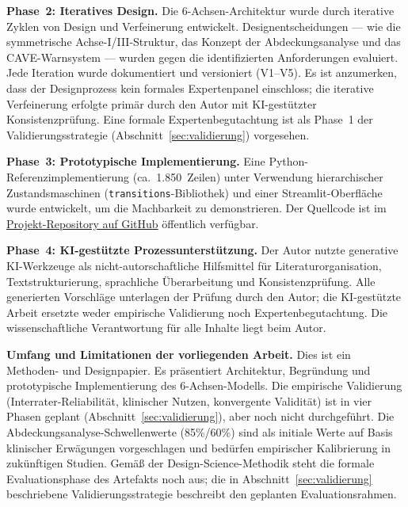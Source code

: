 \documentclass[11pt,a4paper]{article}
\begin{document}
\textbf{Phase~2: Iteratives Design.} Die 6-Achsen-Architektur wurde durch iterative Zyklen von Design und Verfeinerung entwickelt. Designentscheidungen --- wie die symmetrische Achse-I/III-Struktur, das Konzept der Abdeckungsanalyse und das CAVE-Warnsystem --- wurden gegen die identifizierten Anforderungen evaluiert. Jede Iteration wurde dokumentiert und versioniert (V1--V5). Es ist anzumerken, dass der Designprozess kein formales Expertenpanel einschloss; die iterative Verfeinerung erfolgte prim\"ar durch den Autor mit KI-gest\"utzter Konsistenzpr\"ufung. Eine formale Expertenbegutachtung ist als Phase~1 der Validierungsstrategie (Abschnitt~\ref{sec:validierung}) vorgesehen.

\textbf{Phase~3: Prototypische Implementierung.} Eine Python-Referenzimplementierung (ca.\ 1.850~Zeilen) unter Verwendung hierarchischer Zustandsmaschinen (\texttt{transitions}-Bibliothek) und einer Streamlit-Oberfl\"ache wurde entwickelt, um die Machbarkeit zu demonstrieren. Der Quellcode ist im \href{https://github.com/um-bruch/multiaxial-diagnostic-system}{Projekt-Repository auf GitHub} \"offentlich verf\"ugbar.

\textbf{Phase~4: KI-gest\"utzte Prozessunterst\"utzung.} Der Autor nutzte generative KI-Werkzeuge als nicht-autorschaftliche Hilfsmittel f\"ur Literaturorganisation, Textstrukturierung, sprachliche \"Uberarbeitung und Konsistenzpr\"ufung. Alle generierten Vorschl\"age unterlagen der Pr\"ufung durch den Autor; die KI-gest\"utzte Arbeit ersetzte weder empirische Validierung noch Expertenbegutachtung. Die wissenschaftliche Verantwortung f\"ur alle Inhalte liegt beim Autor.

\textbf{Umfang und Limitationen der vorliegenden Arbeit.} Dies ist ein Methoden- und Designpapier. Es pr\"asentiert Architektur, Begr\"undung und prototypische Implementierung des 6-Achsen-Modells. Die empirische Validierung (Interrater-Reliabilit\"at, klinischer Nutzen, konvergente Validit\"at) ist in vier Phasen geplant (Abschnitt~\ref{sec:validierung}), aber noch nicht durchgef\"uhrt. Die Abdeckungsanalyse-Schwellenwerte (85\%/60\%) sind als initiale Werte auf Basis klinischer Erw\"agungen vorgeschlagen und bed\"urfen empirischer Kalibrierung in zuk\"unftigen Studien. Gem\"a\ss{} der Design-Science-Methodik \citep{Hevner2004, Peffers2007} steht die formale Evaluationsphase des Artefakts noch aus; die in Abschnitt~\ref{sec:validierung} beschriebene Validierungsstrategie beschreibt den geplanten Evaluationsrahmen.
\end{document}
